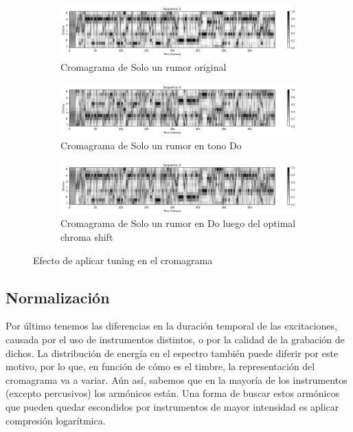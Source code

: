 \documentclass{article}
\begin{document}
\begin{figure}[!htb]
\centering
\begin{subfigure}{\textwidth}
    \includegraphics[width=\textwidth]{chromas/solo_un_rumor_ori.png}
    \caption{Cromagrama de Solo un rumor original}
    \label{fig:16}
\end{subfigure}
\vfill
\begin{subfigure}{\textwidth}
    \includegraphics[width=\textwidth]{chromas/solo_un_rumor_do.png}
    \caption{Cromagrama de Solo un rumor en tono Do}
    \label{16_cropped}
\end{subfigure}
\vfill
\begin{subfigure}{\textwidth}
    \includegraphics[width=\textwidth]{chromas/solo_un_rumor_do_shifted.png}
    \caption{Cromagrama de Solo un rumor en Do luego del optimal chroma shift}
    \label{16_cropped}
\end{subfigure}
\caption{Efecto de aplicar tuning en el cromagrama}
\label{corrimiento}
\end{figure}


\subsection{Normalización}

Por último tenemos las diferencias en la duración temporal de las excitaciones, causada por el uso de instrumentos distintos, o por la calidad de la grabación de dichos. La distribución de energía en el espectro también puede diferir por este motivo, por lo que, en función de cómo es el timbre, la representación del cromagrama va a variar. Aún así, sabemos que en la mayoría de los instrumentos (excepto percusivos) los armónicos están. Una forma de buscar estos armónicos que pueden quedar escondidos por instrumentos de mayor intensidad es aplicar compresión logarítmica.
\end{document}
